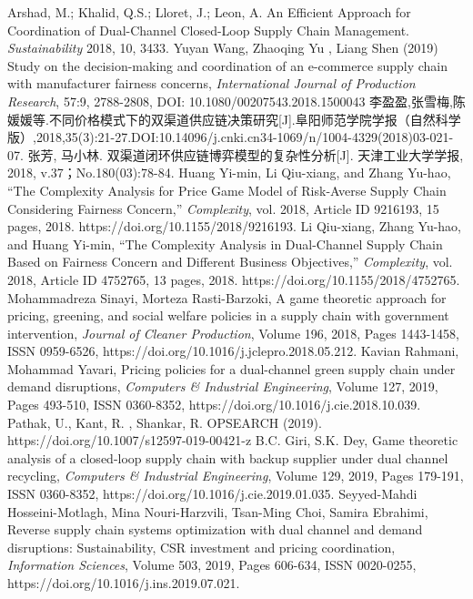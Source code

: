 \documentclass{article}
\begin{document}
\begin{thebibliography}{1}
 Arshad, M.; Khalid, Q.S.; Lloret, J.; Leon, A. An Efficient Approach for Coordination of Dual-Channel Closed-Loop Supply Chain Management. \emph{Sustainability} 2018, 10, 3433.
 Yuyan Wang, Zhaoqing Yu , Liang Shen (2019) Study on the decision-making and coordination of an e-commerce supply chain with manufacturer fairness concerns, \emph{International Journal of Production Research}, 57:9, 2788-2808, DOI: 10.1080/00207543.2018.1500043
 李盈盈,张雪梅,陈媛媛等.不同价格模式下的双渠道供应链决策研究[J].阜阳师范学院学报（自然科学版）,2018,35(3):21-27.DOI:10.14096/j.cnki.cn34-1069/n/1004-4329(2018)03-021-07.
 张芳, 马小林. 双渠道闭环供应链博弈模型的复杂性分析[J]. 天津工业大学学报, 2018, v.37；No.180(03):78-84.
 Huang Yi-min, Li Qiu-xiang, and Zhang Yu-hao, “The Complexity Analysis for Price Game Model of Risk-Averse Supply Chain Considering Fairness Concern,” \emph{Complexity}, vol. 2018, Article ID 9216193, 15 pages, 2018. https://doi.org/10.1155/2018/9216193.
 Li Qiu-xiang, Zhang Yu-hao, and Huang Yi-min, “The Complexity Analysis in Dual-Channel Supply Chain Based on Fairness Concern and Different Business Objectives,” \emph{Complexity}, vol. 2018, Article ID 4752765, 13 pages, 2018. https://doi.org/10.1155/2018/4752765.
 Mohammadreza Sinayi, Morteza Rasti-Barzoki, A game theoretic approach for pricing, greening, and social welfare policies in a supply chain with government intervention, \emph{Journal of Cleaner Production}, Volume 196, 2018, Pages 1443-1458, ISSN 0959-6526, https://doi.org/10.1016/j.jclepro.2018.05.212.
 Kavian Rahmani, Mohammad Yavari, Pricing policies for a dual-channel green supply chain under demand disruptions, \emph{Computers \& Industrial Engineering}, Volume 127, 2019, Pages 493-510, ISSN 0360-8352, https://doi.org/10.1016/j.cie.2018.10.039.
 Pathak, U., Kant, R. , Shankar, R. OPSEARCH (2019). https://doi.org/10.1007/s12597-019-00421-z
 B.C. Giri, S.K. Dey, Game theoretic analysis of a closed-loop supply chain with backup supplier under dual channel recycling, \emph{Computers \& Industrial Engineering}, Volume 129, 2019, Pages 179-191, ISSN 0360-8352, https://doi.org/10.1016/j.cie.2019.01.035. 
 Seyyed-Mahdi Hosseini-Motlagh, Mina Nouri-Harzvili, Tsan-Ming Choi, Samira Ebrahimi, Reverse supply chain systems optimization with dual channel and demand disruptions: Sustainability, CSR investment and pricing coordination, \emph{Information Sciences}, Volume 503, 2019, Pages 606-634, ISSN 0020-0255, https://doi.org/10.1016/j.ins.2019.07.021.

\end{thebibliography}
\end{document}
